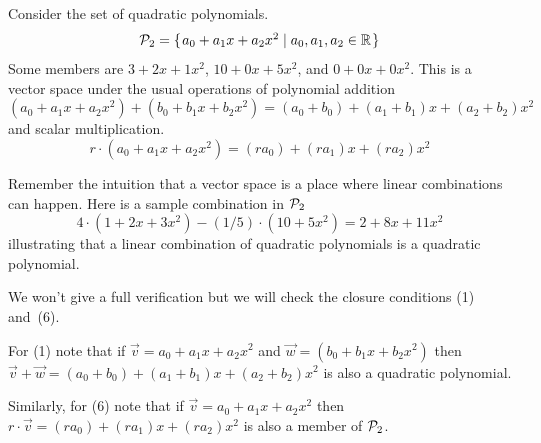 \begin{frame}
\ex
Consider the set of quadratic polynomials.
\begin{equation*}
  \mathcal{P}_2=\mbox{$\{\hspace{0.1em}a_0+a_1x+a_2x^2 \mid a_0,a_1,a_2\in\mathbb{R}\hspace{0.1em}\}$}
\end{equation*}
Some members are $3+2x+1x^2$, $10+0x+5x^2$, and $0+0x+0x^2$.
\pause
This is a vector space under the usual operations of polynomial addition
\begin{equation*}
  (a_0+a_1x+a_2x^2)+(b_0+b_1x+b_2x^2)=(a_0+b_0)+(a_1+b_1)x+(a_2+b_2)x^2
\end{equation*}
and scalar multiplication.
\begin{equation*} 
r\cdot (a_0+a_1x+a_2x^2)=(ra_0)+(ra_1)x+(ra_2)x^2
\end{equation*}

Remember the intuition that a vector space is a place where linear
combinations can happen.
Here is a sample combination in $\mathcal{P}_2$
\begin{equation*}
  4\cdot(1+2x+3x^2)-(1/5)\cdot (10+5x^2)
  =2+8x+11x^2
\end{equation*}
illustrating that 
a linear combination of quadratic polynomials is a quadratic polynomial.
\end{frame}\begin{frame}
We won't give a full verification but
we will check the closure conditions (1) and~(6).

For (1) note that if 
$\vec{v}=a_0+a_1x+a_2x^2$ and 
$\vec{w}=(b_0+b_1x+b_2x^2)$
then $\vec{v}+\vec{w}=(a_0+b_0)+(a_1+b_1)x+(a_2+b_2)x^2$ is also a quadratic
polynomial.

\pause
Similarly, for (6) note that
if $\vec{v}=a_0+a_1x+a_2x^2$ then
$r\cdot \vec{v}=(ra_0)+(ra_1)x+(ra_2)x^2$
is also a member of $\mathcal{P}_2$.
\end{frame}



